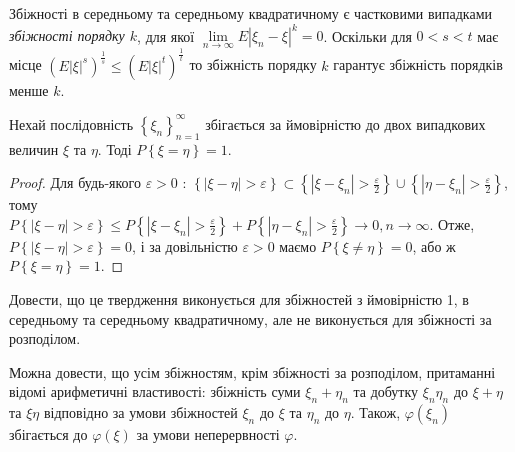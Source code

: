 \begin{remark}
    Збіжності в середньому та середньому квадратичному є частковими випадками \emph{збіжності порядку $k$}, для якої
$\underset{n \to \infty}{\lim} E|\xi_n - \xi|^k = 0$. Оскільки 
для $0 < s < t$ має місце
$( E \left| \xi\right|^s)^{\frac{1}{s}} \leq ( E \left| \xi\right|^t)^{\frac{1}{t}}$
то збіжність порядку $k$ гарантує збіжність порядків менше $k$.
\end{remark}
\begin{proposition*}
     Нехай послідовність $\left\{ \xi_n\right\}_{n=1}^{\infty}$ збігається за ймовірністю до двох випадкових
    величин $\xi$ та $\eta$. Тоді $P\left\{ \xi = \eta\right\} = 1$.
\end{proposition*}
\begin{proof}
    Для будь-якого $\varepsilon > 0$ : $\left\{ |\xi - \eta| > \varepsilon\right\} \subset 
    \left\{ |\xi - \xi_n| > \frac{\varepsilon}{2}\right\} \cup \left\{ |\eta - \xi_n| > \frac{\varepsilon}{2}\right\}$, тому \\
    $P\left\{ |\xi - \eta| > \varepsilon\right\} \leq P\left\{ |\xi - \xi_n| > \frac{\varepsilon}{2}\right\} + 
    P\left\{ |\eta - \xi_n| > \frac{\varepsilon}{2}\right\} \to 0, n\to\infty$.
    Отже, $P\left\{ |\xi - \eta| > \varepsilon\right\} = 0$, і за довільністю $\varepsilon > 0$ маємо $P\left\{ \xi \neq \eta\right\} = 0$,
    або ж $P\left\{ \xi = \eta\right\} = 1$.
\end{proof}
\begin{exercise}
    Довести, що це твердження виконується для збіжностей з ймовірністю 1, в середньому та середньому квадратичному, але не виконується
    для збіжності за розподілом.
\end{exercise}
Можна довести, що усім збіжностям, крім збіжності за розподілом, притаманні відомі арифметичні властивості: збіжність суми $\xi_n + \eta_n$ та добутку
$\xi_n \eta_n$ до $\xi + \eta$ та $\xi \eta$ відповідно за умови збіжностей $\xi_n$ до $\xi$ та $\eta_n$ до $\eta$. Також, $\varphi(\xi_n)$ збігається
до $\varphi(\xi)$ за умови неперервності $\varphi$.

